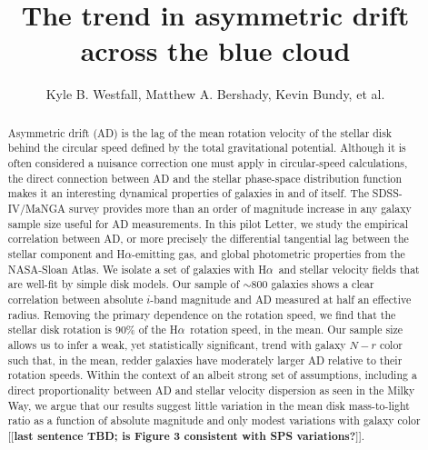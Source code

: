 \documentclass[apj,iop,revtex4,numberedappendix]{emulateapj}
\newcommand{\comment}[2][todo]{{\color{#1}[[{\bf #2}]]}}
\newcommand{\halpha}{H$\alpha$}
\begin{document}
\title{ The trend in asymmetric drift across the blue cloud }

\author{ Kyle B. Westfall, Matthew A.
Bershady, Kevin Bundy, et al. }




\begin{abstract}

Asymmetric drift (AD) is the lag of the mean rotation velocity of the
stellar disk behind the circular speed defined by the total
gravitational potential.  Although it is often considered a nuisance
correction one must apply in circular-speed calculations, the direct
connection between AD and the stellar phase-space distribution function
makes it an interesting dynamical properties of galaxies in and of
itself.  The SDSS-IV/MaNGA survey provides more than an order of
magnitude increase in any galaxy sample size useful for AD measurements.
In this pilot Letter, we study the empirical correlation between AD, or
more precisely the differential tangential lag between the stellar
component and \halpha-emitting gas, and global photometric properties
from the NASA-Sloan Atlas.  We isolate a set of galaxies with \halpha\
and stellar velocity fields that are well-fit by simple disk models.
Our sample of $\sim$800 galaxies shows a clear correlation between
absolute $i$-band magnitude and AD measured at half an effective radius.
Removing the primary dependence on the rotation speed, we find that the
stellar disk rotation is 90\% of the \halpha\ rotation speed, in the
mean.  Our sample size allows us to infer a weak, yet statistically
significant, trend with galaxy $N-r$ color such that, in the mean,
redder galaxies have moderately larger AD relative to their rotation
speeds.  Within the context of an albeit strong set of assumptions,
including a direct proportionality between AD and stellar velocity
dispersion as seen in the Milky Way, we argue that our results suggest
little variation in the mean disk mass-to-light ratio as a function of
absolute magnitude and only modest variations with galaxy color
\comment{last sentence TBD; is Figure 3 consistent with SPS
variations?}.

\end{abstract}
\end{document}
